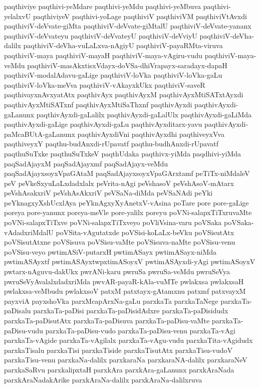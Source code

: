 {paqthiviye
paqthivi-yeMdare
paqthivi-yeMdu
paqthivi-yeMbuva
paqthivi-yelalxvU
paqthiviyeV
paqthivi-yoLage
paqthiviV
paqthiviVM
paqthiviVtAvxdi
paqthiviV-deVvate-giMta
paqthiviV-deVvate-giMtalU
paqthiviV-deVvate-yananx
paqthiviV-deVvateyu
paqthiviV-deVvateyU
paqthiviV-deVviyU
paqthiviV-deVha-dalilx
paqthiviV-deVha-vuLaLxva-nAgiyU
paqthiviV-payaRMta-viruva
paqthiviV-maya
paqthiviV-mayaH
paqthiviV-maya-vAgiru-vudu
paqthiviV-maya-veMdu
paqthiviV-masAkxtisxVdayx-doVSa-dhiVrapayx-saradayx-dapaH
paqthiviV-modalAdavu-gaLige
paqthiviV-loVka
paqthiviV-loVka-gaLu
paqthiviV-loVka-meVva
paqthiviV-vAkayxkUkx
paqthiviV-saveR
paqthivayxnAvxyatAtx
paqthivAyx
paqthivAyxM
paqthivAyxMtiSATxtAyxdi
paqthivAyxMtiSATxnf
paqthivAyxMtiSaThxnf
paqthivAyxdi
paqthivAyxdi-gaLanunx
paqthivAyxdi-gaLalilx
paqthivAyxdi-gaLalUlx
paqthivAyxdi-gaLiMda
paqthivAyxdi-gaLige
paqthivAyxdi-gaLu
paqthivAyxditarx-yavu
paqthivAyxdi-paMcaBUtA-gaLanunx
paqthivAyxdiVni
paqthivAyxdhi
paqthiveyxVva
paqthiveyxY
paqthu-budAnxdi-rUpavatf
paqthu-budhAnxdi-rUpavatf
paqthuSuTxke
paqthuSuTxkeV
paqthUdaka
paqthivx-yiMda
paqdhivi-yiMda
paqSadAjayxM
paqSadAjayxmf
paqSadAjayx-veMdu
paqSadAjayxsoyxVpaGAtaM
paqSadAjayxsoyxVpaGArxtamf
peTiTx-niMdaleV
peV
peVkeSxyuLaLxdadxlalx
peVrita-nAgi
peVshasoV
peVshAsoV-mAtarx
peVshAsakxriV
peVshAsAkxriV
peVSaNa-diMda
peVSaNAdi
peYki
peYknagxyXshUcxlAya
peYknAgxyXyAnetxV-vAsina
poTare
pore
pore-gaLige
poreya
pore-yanunx
poreya-meVle
pore-yalilx
poreyu
poVNi-salapxTiTxruvaMte
poVNi-salapxTiTxve
poVNi-salapxTiTxveyo
poVliVsina-varu
poVSaka
poVSaka-vAdadxriMdalU
poVSita-vAgutatxde
poVSisi-koLaLx-beVku
poVSisutAtx
poVSisutAtxne
poVSisuva
poVSisu-vaMte
poVSisuva-naMte
poVSisu-venu
poVSisu-veyo
pwtimASiV-putarxH
pwtimASayx
pwtimASayx-niMda
pwtimASAyxtf
pwtimASAyxtwpxtimASoyxV
pwtimASAyxdi-yAgi
pwtimASoyxV
pwtarx-nAguvu-dakUkx
pwrANi-karu
pwruSa
pwruSa-veMdu
pwruSeVya
pwruSeVyAvalalxdadxriMda
pwvAR-payaR-kAla-vuMTe
pwlakxsa
pwlakxsaH
pwlakxsa-veMbudu
pwlakxsoV
patxM
patxtayx-gAtamxnu
patxmf
patxvayxM
payxviA
payxshoVka
parxMcapArxNa-gaLu
parxkaTa
parxkaTaNege
parxkaTa-paDisalu
parxkaTa-paDisi
parxkaTa-paDisidAdxre
parxkaTa-paDisidudx
parxkaTa-paDisutAtx
parxkaTa-paDisuva
parxkaTa-paDisu-vaMte
parxkaTa-paDisu-vudu
parxkaTa-paDisu-vudo
parxkaTa-paDisu-venu
parxkaTa-vAgi
parxkaTa-vAgide
parxkaTa-vAgilalx
parxkaTa-vAgu-vudu
parxkaTita-vAgidudx
parxkaTisalu
parxkaTisi
parxkaTiside
parxkaTisutAtx
parxkaTisu-vudoV
parxkaTisu-venu
parxkaNa-dalilx
parxkaraNa
parxkaraNA-dalilx
parxkaraNeV
parxkaSaRvu
parxkalipxtaH
parxkAra
parxkAra-gaLanunx
parxkAraNada
parxkAraNadakArike
parxkAraNa-dalilx
parxkAraNa-dalilxruva
}
